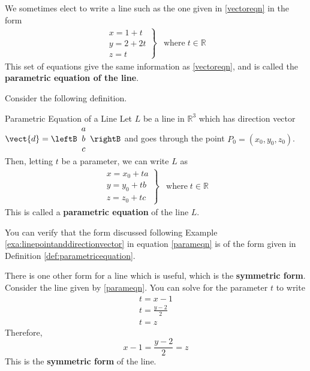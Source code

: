 We sometimes elect to write a line such as the one given in \ref{vectoreqn} in the form
\begin{equation}
\begin{array}{ll}
\left. \begin{array}{l}
x=1+t \\
y=2+2t \\
z=t 
\end{array} \right\} & 
\mbox{where} \; t\in \mathbb{R} 
\end{array}
\label{parameqn}
\end{equation}
This set of equations give the same information as \ref{vectoreqn}, and is called the \textbf{parametric equation of the line}. 

Consider the following definition. 

\begin{definition}{Parametric Equation of a Line}\label{def:parametricequation}
Let $L$ be a line in $\mathbb{R}^3$ which has direction vector $\vect{d} = \leftB
\begin{array}{c}
a \\
b \\
c
\end{array}
\rightB$
and goes through the point $P_0 = \left( x_0, y_0, z_0 \right)$.
Then, letting $t$ be a parameter, we can write $L$ as 
\begin{equation*}
\begin{array}{ll}
\left.
\begin{array}{c}
x = x_0 + ta \\
y = y_0 + tb \\
z = z_0 + tc
\end{array}
\right\} & 
\mbox{where} \; t\in \mathbb{R} 
\end{array}
\end{equation*}
This is called a \textbf{parametric equation} of the line $L$.
\end{definition}

You can verify that the form discussed following Example \ref{exa:linepointanddirectionvector} in equation  \ref{parameqn} is of the form
given in Definition \ref{def:parametricequation}.

There is one other form for a line which is useful, which is the \textbf{symmetric form}. 
Consider the line given by  \ref{parameqn}. You can
solve for the parameter $t$ to write
\begin{equation*}
\begin{array}{l}
t=x-1 \\
t=\frac{y-2}{2} \\
t=z
\end{array}
\end{equation*}
Therefore, 
\begin{equation*}
x-1=\frac{y-2}{2}=z
\end{equation*}
This is the \textbf{symmetric form} of the line.

